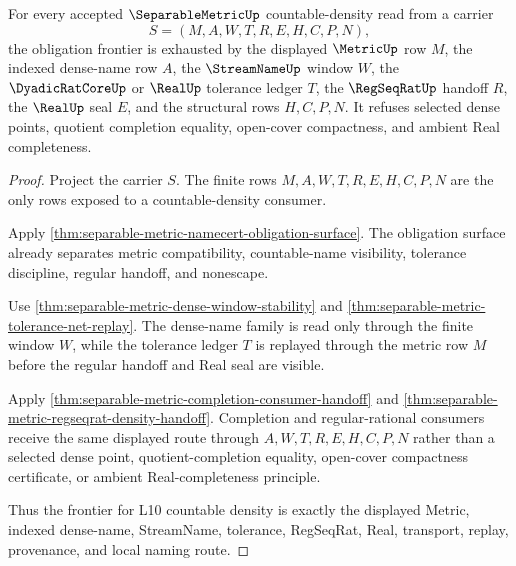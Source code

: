\begin{theorem}
\label{thm:separable-metric-obligation-frontier}
For every accepted $\SeparableMetricUp$ countable-density read from a carrier
$$
S=(M,A,W,T,R,E,H,C,P,N),
$$
the obligation frontier is exhausted by the displayed $\MetricUp$ row $M$, the indexed dense-name row $A$, the $\StreamNameUp$ window $W$, the $\DyadicRatCoreUp$ or $\RealUp$ tolerance ledger $T$, the $\RegSeqRatUp$ handoff $R$, the $\RealUp$ seal $E$, and the structural rows $H,C,P,N$. It refuses selected dense points, quotient completion equality, open-cover compactness, and ambient Real completeness.
\end{theorem}
\begin{proof}
Project the carrier $S$. The finite rows $M,A,W,T,R,E,H,C,P,N$ are the only rows exposed to a countable-density consumer.

Apply \autoref{thm:separable-metric-namecert-obligation-surface}. The obligation surface already separates metric compatibility, countable-name visibility, tolerance discipline, regular handoff, and nonescape.

Use \autoref{thm:separable-metric-dense-window-stability} and \autoref{thm:separable-metric-tolerance-net-replay}. The dense-name family is read only through the finite window $W$, while the tolerance ledger $T$ is replayed through the metric row $M$ before the regular handoff and Real seal are visible.

Apply \autoref{thm:separable-metric-completion-consumer-handoff} and \autoref{thm:separable-metric-regseqrat-density-handoff}. Completion and regular-rational consumers receive the same displayed route through $A,W,T,R,E,H,C,P,N$ rather than a selected dense point, quotient-completion equality, open-cover compactness certificate, or ambient Real-completeness principle.

Thus the frontier for L10 countable density is exactly the displayed Metric, indexed dense-name, StreamName, tolerance, RegSeqRat, Real, transport, replay, provenance, and local naming route.
\end{proof}

